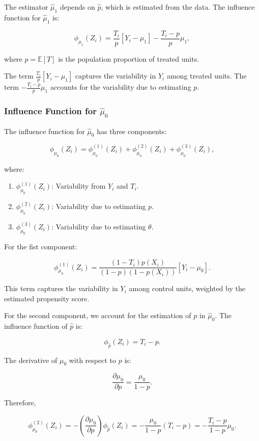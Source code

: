 \documentclass{article}
\begin{document}
The estimator \( \hat{\mu}_1 \) depends on \( \hat{p} \), which is estimated from the data. The influence function for \( \hat{\mu}_1 \) is:

\[
\phi_{\mu_1}(Z_i) = \frac{T_i}{p} [Y_i - \mu_1] - \frac{T_i - p}{p} \mu_1,
\]

where \( p = \mathbb{E}[T] \) is the population proportion of treated units.

The term \( \frac{T_i}{p} [Y_i - \mu_1] \) captures the variability in \( Y_i \) among treated units. The term \( -\frac{T_i - p}{p} \mu_1 \) accounts for the variability due to estimating \( p \).

\subsubsection*{Influence Function for \( \hat{\mu}_0 \)}

The influence function for \( \hat{\mu}_0 \) has three components:

\[
\phi_{\mu_0}(Z_i) = \phi_{\mu_0}^{(1)}(Z_i) + \phi_{\mu_0}^{(2)}(Z_i) + \phi_{\mu_0}^{(3)}(Z_i),
\]

where:

\begin{enumerate}
  \item \( \phi_{\mu_0}^{(1)}(Z_i) \): Variability from \( Y_i \) and \( T_i \).
  \item \( \phi_{\mu_0}^{(2)}(Z_i) \): Variability due to estimating \( p \).
  \item \( \phi_{\mu_0}^{(3)}(Z_i) \): Variability due to estimating \( \theta \).
\end{enumerate}

For the fist component:

\[
\phi_{\mu_0}^{(1)}(Z_i) = \frac{(1 - T_i) p(X_i)}{(1 - p)(1 - p(X_i))} [Y_i - \mu_0].
\]

This term captures the variability in \( Y_i \) among control units, weighted by the estimated propensity score.

For the second component, we account for the estimation of \( p \) in \( \hat{\mu}_0 \). The influence function of \( \hat{p} \) is:

\[
\phi_{\hat{p}}(Z_i) = T_i - p.
\]

The derivative of \( \mu_0 \) with respect to \( p \) is:

\[
\frac{\partial \mu_0}{\partial p} = \frac{\mu_0}{1 - p}.
\]

Therefore,

\[
\phi_{\mu_0}^{(2)}(Z_i) = -\left( \frac{\partial \mu_0}{\partial p} \right) \phi_{\hat{p}}(Z_i) = -\frac{\mu_0}{1 - p} (T_i - p) = -\frac{T_i - p}{1 - p} \mu_0.
\]
\end{document}
